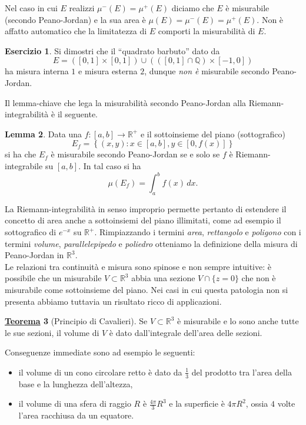 \documentclass[a4paper,twoside]{article}
\newcommand{\Q}{\mathbb{Q}}
\newcommand{\R}{\mathbb{R}}
\theoremstyle{definition}
\newtheorem{theorem}{\color{Red}\underline{\textrm Teorema}}
\newtheorem{lemma}[theorem]{Lemma}
\newtheorem{ex}[theorem]{Esercizio}
\numberwithin{theorem}{section}
\begin{document}
Nel caso in cui $E$ realizzi $\mu^-(E)=\mu^+(E)$ diciamo che $E$ è misurabile (secondo Peano-Jordan) e la sua area è $\mu(E)=\mu^-(E)=\mu^+(E)$. Non è affatto automatico che la limitatezza di $E$ comporti la misurabilità di $E$.
\begin{ex} Si dimostri che il ``quadrato barbuto'' dato da
$$ E=([0,1]\times[0,1])\cup (([0,1]\cap\Q)\times [-1,0]) $$
ha misura interna $1$ e misura esterna $2$, dunque \emph{non è} misurabile secondo Peano-Jordan. 
\end{ex}
Il lemma-chiave che lega la misurabilità secondo Peano-Jordan alla Riemann-integrabilità è il seguente.
\begin{lemma} Data una $f:[a,b]\to\R^+$ e il sottoinsieme del piano (sottografico) 
$$ E_f = \left\{(x,y): x\in[a,b], y\in[0,f(x)]\right\} $$
si ha che $E_f$ è misurabile secondo Peano-Jordan se e solo se $f$ è Riemann-integrabile su $[a,b]$. In tal caso si ha 
$$ \mu(E_f)=\int_{a}^{b} f(x)\,dx.$$
\end{lemma}

La Riemann-integrabilità in senso improprio permette pertanto di estendere il concetto di area anche a sottoinsiemi del piano illimitati, come ad esempio il sottografico di $e^{-x}$ su $\R^+$. Rimpiazzando i termini \emph{area}, \emph{rettangolo} e \emph{poligono} con i termini \emph{volume}, \emph{parallelepipedo} e \emph{poliedro} otteniamo la definizione della misura di Peano-Jordan in $\R^3$.\\
Le relazioni tra continuità e misura sono spinose e non sempre intuitive: è possibile che un misurabile $V\subset\R^3$ abbia una sezione $V\cap\{z=0\}$ che non è misurabile come sottoinsieme del piano. Nei casi in cui questa patologia non si presenta abbiamo tuttavia un risultato ricco di applicazioni.

\begin{theorem}[Principio di Cavalieri] Se $V\subset\R^3$ è misurabile e lo sono anche tutte le sue sezioni, il volume di $V$ è dato dall'integrale dell'area delle sezioni. 
\end{theorem}

Conseguenze immediate sono ad esempio le seguenti:
\begin{itemize}
 \item il volume di un cono circolare retto è dato da $\frac{1}{3}$ del prodotto tra l'area della base e la lunghezza dell'altezza,
 \item il volume di una sfera di raggio $R$ è $\frac{4\pi}{3}R^3$ e la superficie è $4\pi R^2$, ossia $4$ volte l'area racchiusa da un equatore.
\end{itemize}
\end{document}
